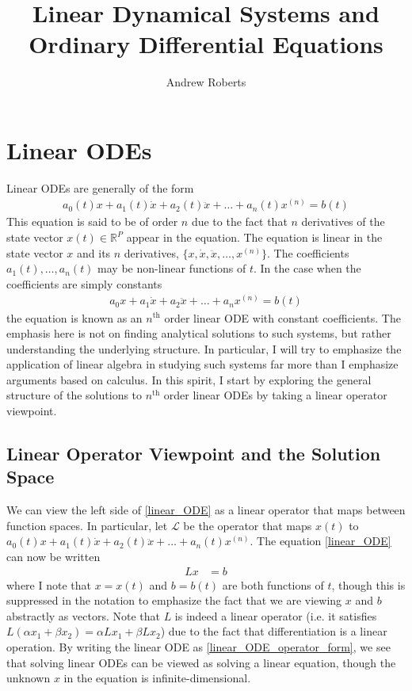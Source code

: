 \documentclass[12pt]{article}
\title{Linear Dynamical Systems and Ordinary Differential Equations}
\author{Andrew Roberts}
\newcommand{\R}{\mathbb{R}}
\begin{document}
\maketitle
\tableofcontents
\newpage

\section{Linear ODEs}
Linear ODEs are generally of the form 
\begin{align}
a_0(t)x + a_1(t) \dot{x} + a_2(t) \ddot{x} + \dots + a_n(t) x^{(n)} = b(t) \label{linear_ODE}
\end{align}
This equation is said to be of order $n$ due to the fact that $n$ derivatives of the state vector $x(t) \in \R^P$ appear in the equation. 
The equation is linear in the state vector $x$ and its $n$ derivatives, $\{x, \dot{x}, \ddot{x}, \dots, x^{(n)}\}$. The coefficients 
$a_1(t), \dots, a_n(t)$ may be non-linear functions of $t$. In the case when the coefficients are simply constants 
\begin{align*}
a_0 x + a_1 \dot{x} + a_2 \ddot{x} + \dots + a_n x^{(n)} = b(t)
\end{align*}
the equation is known as an $n^{\text{th}}$ order linear ODE with constant coefficients. The emphasis here is not on finding analytical solutions 
to such systems, but rather understanding the underlying structure. In particular, I will try to emphasize the application of linear algebra in studying 
such systems far more than I emphasize arguments based on calculus. In this spirit, I start by exploring the general structure of the solutions to 
$n^{\text{th}}$ order linear ODEs by taking a linear operator viewpoint. 

\subsection{Linear Operator Viewpoint and the Solution Space}
We can view the left side of \ref{linear_ODE} as a linear operator that maps between function spaces. In particular, let $\mathcal{L}$ be the operator 
that maps $x(t)$ to $a_0(t)x + a_1(t) \dot{x} + a_2(t) \ddot{x} + \dots + a_n(t) x^{(n)}$. The equation \ref{linear_ODE} can now be written 
\begin{align}
Lx &= b \label{linear_ODE_operator_form}
\end{align}
where I note that $x = x(t)$ and $b = b(t)$ are both functions of $t$, though this is suppressed in the notation to emphasize the fact that we are viewing $x$ and 
$b$ abstractly as vectors. Note that $L$ is indeed a linear operator (i.e. it satisfies $L(\alpha x_1 + \beta x_2) = \alpha L x_1 + \beta L x_2$) due to the fact that differentiation 
is a linear operation. By writing the linear ODE as \ref{linear_ODE_operator_form}, we see that solving linear ODEs can be viewed as solving a linear equation, though the unknown 
$x$ in the equation is infinite-dimensional. 
\end{document}
